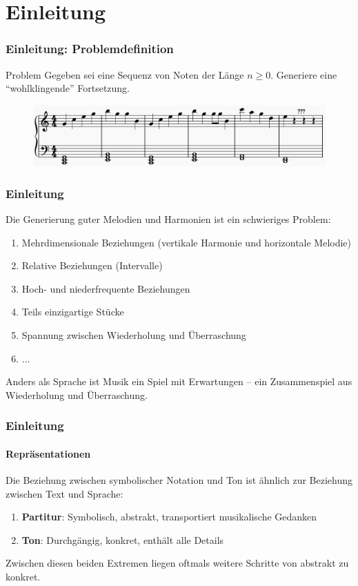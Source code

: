 \documentclass[aspectratio=169]{beamer}
\begin{document}
\begin{frame}
\begin{columns}
\begin{column}{0.3\textwidth}
		\end{column}
	\end{columns}
\end{frame}

\section{Einleitung}

\begin{frame}
	\frametitle{Einleitung: Problemdefinition}
	\begin{block}{Problem}
		Gegeben sei eine Sequenz von Noten der Länge $n \geq 0$. Generiere eine ``wohlklingende'' Fortsetzung.
	\end{block}
	\begin{figure}
		\includegraphics[width=\textwidth]{notes}
	\end{figure}
\end{frame}


\begin{frame}
	\frametitle{Einleitung}
	Die Generierung guter Melodien und Harmonien ist ein schwieriges Problem:
	\begin{enumerate}[label=$\bullet$]
		\item Mehrdimensionale Beziehungen (vertikale Harmonie und horizontale Melodie)
		\item Relative Beziehungen (Intervalle)
		\item Hoch-  und niederfrequente Beziehungen
		\item Teils einzigartige Stücke
		\item Spannung zwischen Wiederholung und Überraschung
		\item $\ldots$
	\end{enumerate}
	Anders als Sprache ist Musik ein Spiel mit Erwartungen -- ein Zusammenspiel aus Wiederholung und Überraschung.
\end{frame}

\begin{frame}
	\frametitle{Einleitung}
	\framesubtitle{Repräsentationen}
	Die Beziehung zwischen symbolischer Notation und Ton ist ähnlich zur Beziehung zwischen Text und Sprache:
	\begin{enumerate}[label=$\bullet$]
		\item \textbf{Partitur}: Symbolisch, abstrakt, transportiert musikalische Gedanken
		\item \textbf{Ton}: Durchgängig, konkret, enthält alle Details
	\end{enumerate}
	
	Zwischen diesen beiden Extremen liegen oftmals weitere Schritte von abstrakt zu konkret.
\end{frame}
\end{document}
